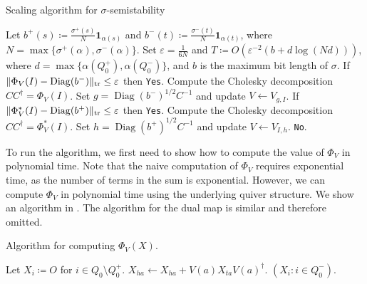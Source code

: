 \documentclass[a4paper,11pt]{article}
\numberwithin{equation}{section}
\newcommand{\eps}{\varepsilon}
\newcommand{\ones}{\mathbf{1}}
\DeclareMathOperator{\tr}{tr}
\DeclareMathOperator{\Diag}{Diag}
\DeclarePairedDelimiter{\norm}{\lVert}{\rVert}
\begin{document}
\begin{algorithm}
    \caption{Scaling algorithm for $\sigma$-semistability\label{alg:scaling-ss}}
    \begin{algorithmic}[1]
        \State Let $b^+(s) \coloneqq \frac{\sigma^+(s)}{N} \ones_{\alpha(s)}$ and $b^-(t) \coloneqq \frac{\sigma^-(t)}{N} \ones_{\alpha(t)}$, where $N = \max\{\sigma^+(\alpha), \sigma^-(\alpha)\}$.
        \State Set $\eps = \frac{1}{6N}$ and $T \coloneqq O(\eps^{-2}(b + d \log (Nd)))$, where $d = \max\{\alpha(Q_0^+), \alpha(Q_0^-)\}$, and $b$ is the maximum bit length of $\sigma$.
        \State {}
        \State If $\norm{\Phi_V(I) - \Diag(b^-)}_{\tr} \leq \eps$ then \Return \texttt{Yes}.
        \State Compute the Cholesky decomposition $CC^\dagger = \Phi_V(I)$. Set $g = \Diag(b^-)^{1/2}C^{-1}$ and update $V \gets V_{g, I}$.
        \State {}
        \State If $\norm{\Phi^*_V(I) - \Diag(b^+)}_{\tr} \leq \eps$ then \Return \texttt{Yes}.
        \State Compute the Cholesky decomposition $CC^\dagger = \Phi_V^*(I)$. Set $h = \Diag(b^+)^{1/2}C^{-1}$ and update $V \gets V_{I, h}$.
        \EndFor
        \State \Return \texttt{No}.
    \end{algorithmic}
\end{algorithm}

To run the algorithm, we first need to show how to compute the value of $\Phi_V$ in polynomial time. 
Note that the naive computation of $\Phi_V$ requires exponential time, as the number of terms in the sum is exponential.
However, we can compute $\Phi_V$ in polynomial time using the underlying quiver structure.
We show an algorithm in .
The algorithm for the dual map is similar and therefore omitted.

\begin{algorithm}
    \caption{Algorithm for computing $\Phi_V(X)$.\label{alg:CP}}
    \begin{algorithmic}[1]
        \State Let $X_i \coloneqq O$ for $i \in Q_0 \setminus Q_0^+$.
            \State $X_{ha} \gets X_{ha} + V(a) X_{ta} V(a)^\dagger$.
        \EndFor
        \State \Return $(X_i : i \in Q^-_0)$.
    \end{algorithmic}
\end{algorithm}
\end{document}
